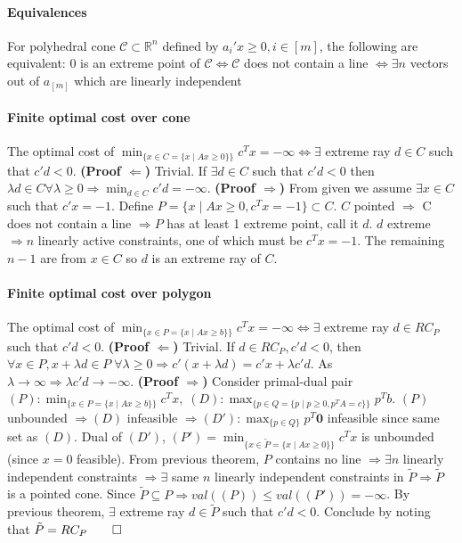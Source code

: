 \documentclass{article}
\begin{document}
\paragraph{Equivalences} For polyhedral cone $\mathcal C\subset \mathbb R^n$ defined by $a_i'x \geq 0, i\in [m]$, the following are equivalent: $0$ is an extreme point of $\mathcal C\iff \mathcal C$ does not contain a line $\iff \exists n$ vectors out of $a_{[m]}$ which are linearly independent


\paragraph{Finite optimal cost over cone} The optimal cost of $\min_{\{x \in C=\{x\mid Ax \geq 0\}\}} c^Tx = -\infty \iff \exists$ extreme ray $d\in C$ such that $c'd < 0$. \textbf{(Proof $\Leftarrow$)} Trivial. If $\exists d\in C$ such that $c'd < 0$ then $\lambda d\in C \forall \lambda \geq 0 \Rightarrow \min_{d\in C}c'd = -\infty$. \textbf{(Proof $\Rightarrow$)} From given we assume $\exists x\in C$ such that $c'x = -1$. Define $P = \{x \mid Ax \geq 0, c^Tx = -1\}\subset C$. $C$ pointed $\Rightarrow $ C does not contain a line $\Rightarrow P$ has at least 1 extreme point, call it $d$. $d$ extreme $\Rightarrow n$ linearly active constraints, one of which must be $c^Tx = -1$. The remaining $n-1$ are from $x \in C$ so $d$ is an extreme ray of $C$. 

\paragraph{Finite optimal cost over polygon} The optimal cost of $\min_{\{x \in P=\{x\mid Ax\geq b\}\}} c^Tx = -\infty \iff \exists$ extreme ray $d\in RC_P$ such that $c'd < 0$. \textbf{(Proof $\Leftarrow$)} Trivial. If $d \in RC_P, c'd < 0$, then $\forall x\in P, x + \lambda d \in P\;\forall \lambda \geq 0 \Rightarrow c'(x + \lambda d) = c'x + \lambda c'd$. As $\lambda \rightarrow \infty \Rightarrow \lambda c'd \rightarrow -\infty$. \textbf{(Proof $\Rightarrow$)} Consider primal-dual pair $(P):\min_{\{x \in P=\{x\mid Ax\geq b\}\}} c^Tx,\; (D):\max_{\{p \in Q=\{p\mid p\geq 0, p^TA=c\}\}} p^Tb$. $(P)$ unbounded $\Rightarrow (D)$ infeasible $\Rightarrow (D'):\max_{\{p \in Q\}}p^T\mathbf{0}$ infeasible since same set as $(D)$. Dual of $(D')$, $(P') = \min_{\{x \in \tilde P=\{x\mid Ax\geq 0\}\}} c^Tx$ is unbounded (since $x = 0$ feasible). From previous theorem, $P$ contains no line $\Rightarrow \exists n$ linearly independent constraints $\Rightarrow \exists$ same $n$ linearly independent constraints in $\tilde P \Longrightarrow \tilde P$ is a pointed cone. Since $\tilde P \subseteq P \Rightarrow val((P)) \leq val((P')) = -\infty$. By previous theorem, $\exists$ extreme ray $d \in \tilde P$ such that $c'd < 0$. Conclude by noting that $\tilde P = RC_P  \qed$
\end{document}
